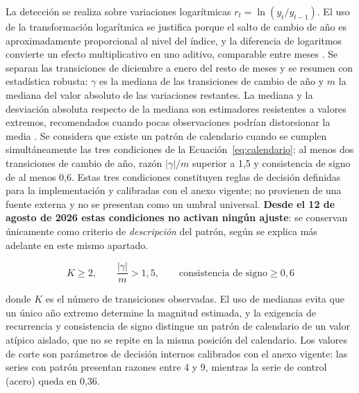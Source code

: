\documentclass[12pt,letterpaper]{article}
\providecommand{\parencite}{\citep}
\begin{document}
La detección se realiza sobre variaciones logarítmicas \(r_t=\ln(y_t/y_{t-1})\). El uso de la transformación logarítmica se justifica porque el salto de cambio de año es aproximadamente proporcional al nivel del índice, y la diferencia de logaritmos convierte un efecto multiplicativo en uno aditivo, comparable entre meses \parencite{hyndman2021fpp3}. Se separan las transiciones de diciembre a enero del resto de meses y se resumen con estadística robusta: \(\gamma\) es la mediana de las transiciones de cambio de año y \(m\) la mediana del valor absoluto de las variaciones restantes. La mediana y la desviación absoluta respecto de la mediana son estimadores resistentes a valores extremos, recomendados cuando pocas observaciones podrían distorsionar la media \parencite{nist_outliers}. Se considera que existe un patrón de calendario cuando se cumplen simultáneamente las tres condiciones de la Ecuación~\ref{eq:calendario}: al menos dos transiciones de cambio de año, razón \(|\gamma|/m\) superior a 1,5 y consistencia de signo de al menos 0,6. Estas tres condiciones constituyen reglas de decisión definidas para la implementación y calibradas con el anexo vigente; no provienen de una fuente externa y no se presentan como un umbral universal. \textbf{Desde el 12 de agosto de 2026 estas condiciones no activan ningún ajuste}: se conservan únicamente como criterio de \emph{descripción} del patrón, según se explica más adelante en este mismo apartado.

\begin{equation}
K\geq2,\qquad \frac{|\gamma|}{m}>1{,}5,\qquad \text{consistencia de signo}\geq0{,}6
\label{eq:calendario}
\end{equation}

donde \(K\) es el número de transiciones observadas. El uso de medianas evita que un único año extremo determine la magnitud estimada, y la exigencia de recurrencia y consistencia de signo distingue un patrón de calendario de un valor atípico aislado, que no se repite en la misma posición del calendario. Los valores de corte son parámetros de decisión internos calibrados con el anexo vigente: las series con patrón presentan razones entre 4 y 9, mientras la serie de control (acero) queda en 0,36.
\end{document}
